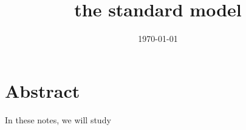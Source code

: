 \documentclass[a4paper, 12pt]{memoir}
\title{the standard model}
\date{\today}
\begin{document}
\frontmatter



\tableofcontents

\mainmatter



\chapter*{Abstract}

    In these notes, we will study 



\backmatter

\nocite{rqmlecture2}

\clearpage
{}
\printbibliography
\end{document}
